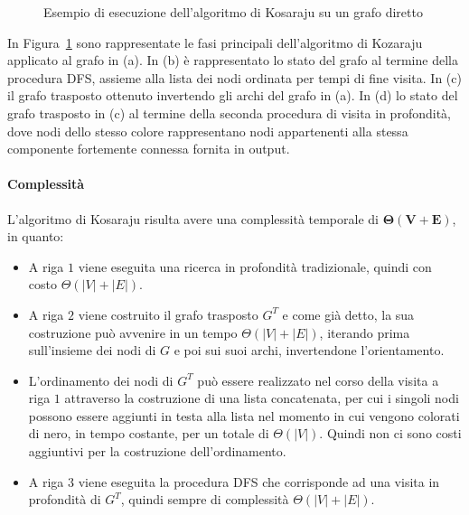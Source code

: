 \begin{figure}
    \resizebox{!}{4cm}{
        }
    \resizebox{!}{4cm}{
        }
    \caption{Esempio di esecuzione dell'algoritmo di Kosaraju su un grafo diretto}
    \label{fig:kozaraju_example}
\end{figure}

In Figura~\ref{fig:kozaraju_example} sono rappresentate le fasi principali dell'algoritmo di Kozaraju
applicato al grafo in (a).
In (b) \`e rappresentato lo stato del grafo al termine della procedura DFS, assieme alla lista dei nodi ordinata
per tempi di fine visita.
In (c) il grafo trasposto ottenuto invertendo gli archi del grafo in (a).
In (d) lo stato del grafo trasposto in (c) al termine della seconda procedura di visita in
profondit\`a, dove nodi dello stesso colore rappresentano nodi appartenenti alla stessa componente fortemente
connessa fornita in output.

\paragraph{Complessit\`a}
L'algoritmo di Kosaraju risulta avere una complessit\`a temporale di $\mathbf{\Theta(V + E)}$, in quanto:
\begin{itemize}
    \item A riga $1$ viene eseguita una ricerca in profondit\`a tradizionale, quindi con costo $\Theta(|V| + |E|)$.
    \item A riga $2$ viene costruito il grafo trasposto $G^T$ e come gi\`a detto, la sua costruzione pu\`o avvenire in
    un tempo $\Theta(|V| + |E|)$, iterando prima sull'insieme dei nodi di $G$ e poi sui suoi archi, invertendone
    l'orientamento.
    \item L'ordinamento dei nodi di $G^T$ pu\`o essere realizzato nel corso della visita a riga $1$ attraverso la
    costruzione di una lista concatenata, per cui i singoli nodi possono essere aggiunti in testa alla lista nel
    momento in cui vengono colorati di nero, in tempo costante, per un totale di $\Theta(|V|)$.
    Quindi non ci sono costi aggiuntivi per la costruzione dell'ordinamento.
    \item A riga $3$ viene eseguita la procedura DFS che corrisponde ad una visita in profondit\`a di $G^T$, quindi
    sempre di complessit\`a $\Theta(|V| + |E|)$.
\end{itemize}

\newpage

